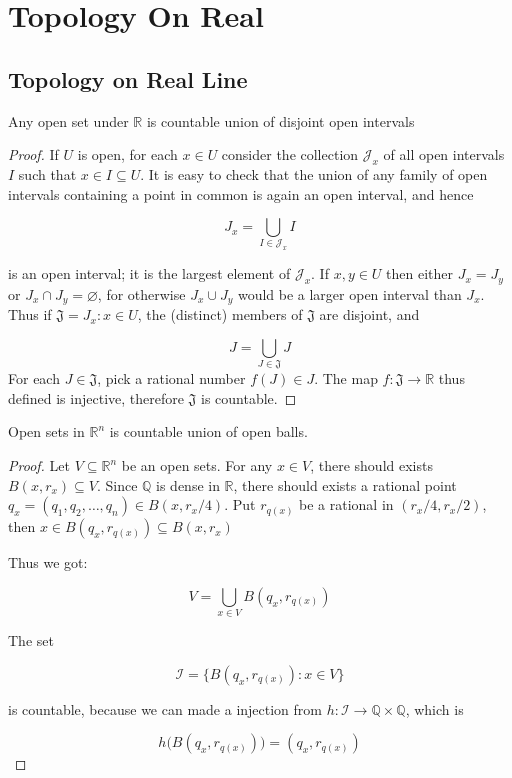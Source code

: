 \section{Topology On Real}

\subsection{Topology on Real Line}

\begin{thm}
    Any open set under $\mathbb{R}$ is countable union
    of disjoint open intervals
\end{thm}

\begin{proof}
    If $U$ is open, for each $x \in U$ consider the collection $\mathcal{J}_x$ of all open
intervals $I$ such that $x \in I \subseteq U$. It is easy to check that the union of any family
of open intervals containing a point in common is again an open interval, and hence

\[
    J_x = \bigcup_{I \in \mathcal{J}_x} I
\]

is an open interval; it is the largest element of $\mathcal{J}_x$. If $x, y \in U$ then
either $J_x = J_y$ or $J_x \cap J_y = \varnothing$, for otherwise $J_x \cup J_y$ 
would be a larger open interval
than $J_x$. Thus if $\mathfrak{J} = { J_x : x \in U}$, the (distinct) members of $\mathfrak{J}$ are disjoint,
and 

\[
J = \bigcup_{J \in \mathfrak{J}} J
\]
For each $J \in \mathfrak{J}$, pick a rational number $f(J) \in J$. The map
$f : \mathfrak{J} \to \mathbb{R}$ thus defined is injective,  therefore $\mathfrak{J}$ is
countable.
\end{proof}

\begin{thm}
    Open sets in $\mathbb{R}^n$ is countable union of open balls.
\end{thm}

\begin{proof}
   Let $V \subseteq \mathbb{R}^n$ be an open sets. For any $x \in V$, there should exists $B(x, r_x) \subseteq V$. 
   Since $\mathbb{Q}$ is dense in $\mathbb{R}$, there should exists a rational point $q_x = (q_1,q_2,\dots,q_n) \in B(x, r_x/4)$.
   Put $r_{q(x)}$ be a rational in $(r_x /4 ,r_x/2)$, then $x \in B(q_x, r_{q(x)}) \subseteq B(x, r_x)$

   Thus we got:

   \[
    V = \bigcup_{x \in V} B(q_x ,r_{q(x)})
   \]

   The set

   \[
    \mathcal{I} = \{ B(q_x, r_{q(x)}): x \in V\}
   \]

   is countable, because we can made a injection from $h: \mathcal{I} \to \mathbb{Q} \times \mathbb{Q}$, which is 

   \[
    h\Big(B(q_x, r_{q(x)})\Big) = (q_x, r_{q(x)})
   \]
\end{proof}
